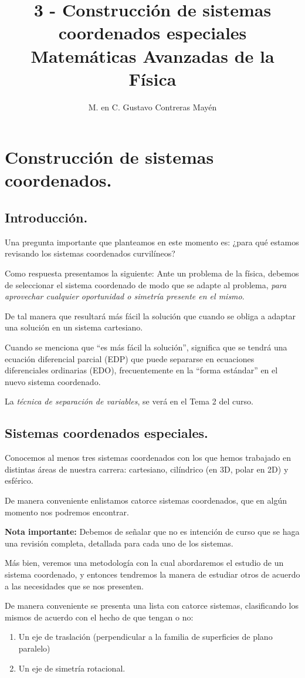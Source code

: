 \documentclass[12pt]{article}
\title{3 - Construcción de sistemas coordenados especiales \\[0.3em]  \large{Matemáticas Avanzadas de la Física}\vspace{-3ex}}
\author{M. en C. Gustavo Contreras Mayén}
\date{ }
\numberwithin{equation}{section}
\begin{document}
\vspace{-4cm}
\maketitle
\fontsize{14}{14}\selectfont
\tableofcontents
\newpage

\section{Construcción de sistemas coordenados.}
\subsection{Introducción.}

Una pregunta importante que planteamos en este momento es: ¿para qué estamos revisando los sistemas coordenados curvilíneos?
\par
Como respuesta presentamos la siguiente: Ante un problema de la física, debemos de seleccionar el sistema coordenado de modo que se adapte al problema, \emph{para aprovechar cualquier oportunidad o simetría presente en el mismo}.
\par
De tal manera que resultará más fácil la solución que cuando se obliga a adaptar una solución en un sistema cartesiano.
\par
Cuando se menciona que \enquote{es más fácil la solución}, significa que se tendrá una ecuación diferencial parcial (EDP) que puede separarse en ecuaciones diferenciales ordinarias (EDO), frecuentemente en la \enquote{forma estándar} en el nuevo sistema coordenado.
\par
La \emph{técnica de separación de variables}, se verá en el Tema 2 del curso.

\subsection{Sistemas coordenados especiales.}

Conocemos al menos tres sistemas coordenados con los que hemos trabajado en distintas áreas de nuestra carrera: cartesiano, cilíndrico (en 3D, polar en 2D) y esférico.
\par
De manera conveniente enlistamos catorce sistemas coordenados, que en algún momento nos podremos encontrar.
\par
\textbf{Nota importante: } Debemos de señalar que no es intención de curso que se haga una revisión completa, detallada para cada uno de los sistemas.
\par
Más bien, veremos una metodología con la cual abordaremos el estudio de un sistema coordenado, y entonces tendremos la manera de estudiar otros de acuerdo a las necesidades que se nos presenten.
\par
De manera conveniente se presenta una lista con catorce sistemas, clasificando los mismos de acuerdo con el hecho de que tengan o no:
\begin{enumerate}
\item Un eje de traslación (perpendicular a la familia de superficies de plano paralelo)
\item Un eje de simetría rotacional.
\end{enumerate}
\end{document}
